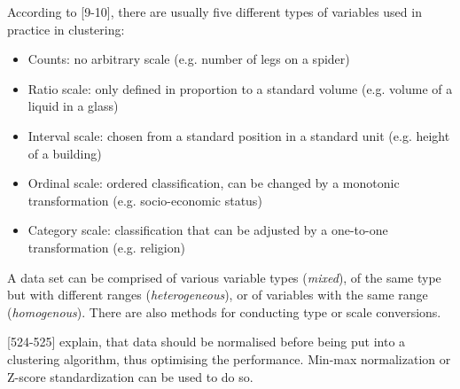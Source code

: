 According to \textcite{hartigan1975clustering}[9-10], there are usually five different types of variables used in practice in clustering:
\begin{itemize}
  \item Counts: no arbitrary scale (e.g. number of legs on a spider) 
  \item Ratio scale: only defined in proportion to a standard volume (e.g. volume of a liquid in a glass)
  \item Interval scale: chosen from a standard position in a standard unit (e.g. height of a building)
  \item Ordinal scale: ordered classification, can be changed by a monotonic transformation (e.g. socio-economic status)
  \item Category scale: classification that can be adjusted by a one-to-one transformation (e.g. religion)
\end{itemize}
A data set can be comprised of various variable types (\textit{mixed}), of the same type but with different ranges (\textit{heterogeneous}), or of variables with the same range (\textit{homogenous}). There are also methods for conducting type or scale conversions.



\textcite{DataMiningAndPredictiveAnalytics}[524-525] explain, that data should be normalised before being put into a clustering algorithm, thus optimising the performance. Min-max normalization or Z-score standardization can be used to do so.












